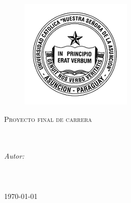 \documentclass[
11pt, %
english, %
spanish,
singlespacing, %
liststotoc, %
headsepline, %
]{MastersDoctoralThesis} %
\author{Luis F. \textsc{Villalba V.}} %
\begin{document}
\frontmatter %
\pagestyle{plain} %


\begin{titlepage}
\begin{center}

\begin{figure}[H]
\centering
\includegraphics{Figuras/uca}
\decoRule
\end{figure}

{\scshape\LARGE \univname\par}\vspace{1.5cm} %
\textsc{\Large Proyecto final de carrera}\\[0.5cm] %

\HRule \\[0.4cm] %
{\huge \bfseries \ttitle\par}\vspace{0.4cm} %
\HRule \\[1.5cm] %

\Large \emph{Autor:}\\
\Large \href{}{\authorname} \\[1cm] %

\Large \facname\\ %
\Large \deptname \\[5mm]

{\large\today}\\[1cm] %

\end{center}
\end{titlepage}
\end{document}
